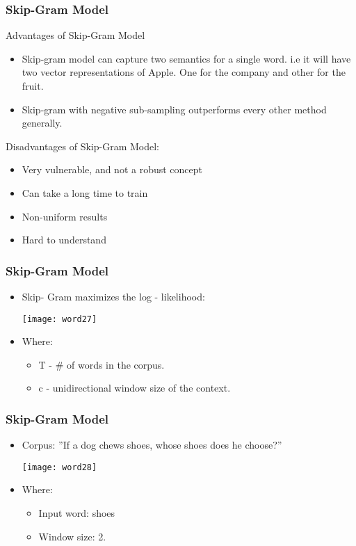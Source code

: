 \begin{frame}[fragile]\frametitle{Skip-Gram Model}
Advantages of Skip-Gram Model
\begin{itemize}
\item Skip-gram model can capture two semantics for a single word. i.e it will have two vector representations of Apple. One for the company and other for the fruit.
\item     Skip-gram with negative sub-sampling outperforms every other method generally.
\end{itemize}
Disadvantages  of  Skip-Gram Model:
\begin{itemize}
\item Very vulnerable, and not a robust concept
\item Can take a long time to train
\item Non-uniform results
\item Hard to understand 
\end{itemize}
\end{frame}


\begin{frame}[fragile]\frametitle{Skip-Gram Model}
\begin{itemize}
\item Skip- Gram maximizes the log - likelihood:
\begin{center}
\texttt{[image: word27]}
\end{center}
\item Where:
\begin{itemize}
\item T - \# of words in the corpus.
\item c - unidirectional window size of the context.
\end{itemize}
\end{itemize}
\end{frame}
\begin{frame}[fragile]\frametitle{Skip-Gram Model}
\begin{itemize}
\item Corpus: ''If a dog chews shoes, whose shoes does he choose?''
\begin{center}
\texttt{[image: word28]}
\end{center}
\item Where:
\begin{itemize}
\item Input word: shoes
\item Window size: 2.
\end{itemize}
\end{itemize}
\end{frame}


